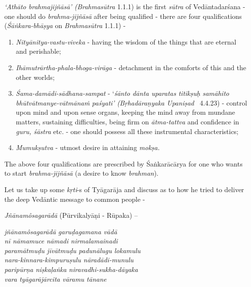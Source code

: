 \textit{‘Athāto brahmajijñāsā' (Brahmasūtra} 1.1.1) is the first \textit{sūtra} of Vedānta\-darśana - one should do \textit{brahma-jijñāsā} after being qualified - there are four qualifications (\textit{Śāṅkara-bhāṣya} on \textit{Brahmasūtra} 1.1.1) -

\vspace{-.3cm}

\begin{enumerate}
\itemsep=0pt

 \item \textit{Nityānitya-vastu-viveka} - having the wisdom of the things that are eternal and perishable;

 \item \textit{Ihāmutrārtha-phala-bhoga-virāga} - detachment in the comforts of this and the other worlds;

 \item \textit{Śama-damādi-sādhana-sampat} - ‘\textit{śānto dānta uparatas titikṣuḥ samā\-hito bhūtvātmanye-vātmānaṁ paśyati’ (Bṛhadāraṇyaka Upaniṣad}  4.4.23) - control upon mind and upon sense organs, keeping the mind away from mundane matters, sustaining difficulties, being firm on \textit{ātma-tattva} and confidence in \textit{guru, śāstra} etc. - one should possess all these instrumental characteristics;

 \item \textit{Mumukṣutva} - utmost desire in attaining \textit{mokṣa.}

\end{enumerate}

The above four qualifications are prescribed by Śaṅkarācārya for one who wants to start \textit{brahma-jijñāsā} (a desire to know \textit{brahman}).

Let us take up some \textit{kṛti}-s of Tyāgarāja and discuss as to how he tried to deliver the deep Vedāntic message to common people -

\textit{Jñānamôsagarādā} (Pūrvikalyāṇi - Rūpaka) –

\begin{centerquote}
\textit{jñānamôsagarādā garuḍagamana vādā} \\ \textit{nī nāmamuce nāmadi nirmalamainadi} \\ \textit{paramātmuḍu jīvātmuḍu padunālugu lokamulu}\\ \textit{nara-kinnara-kimpuruṣulu nāradādi-munulu}\\ \textit{paripūrṇa niṣkaḷaṅka niravadhi-sukha-dāyaka}\\ \textit{vara tyāgarājārcita vāramu tānane}
\end{centerquote}

